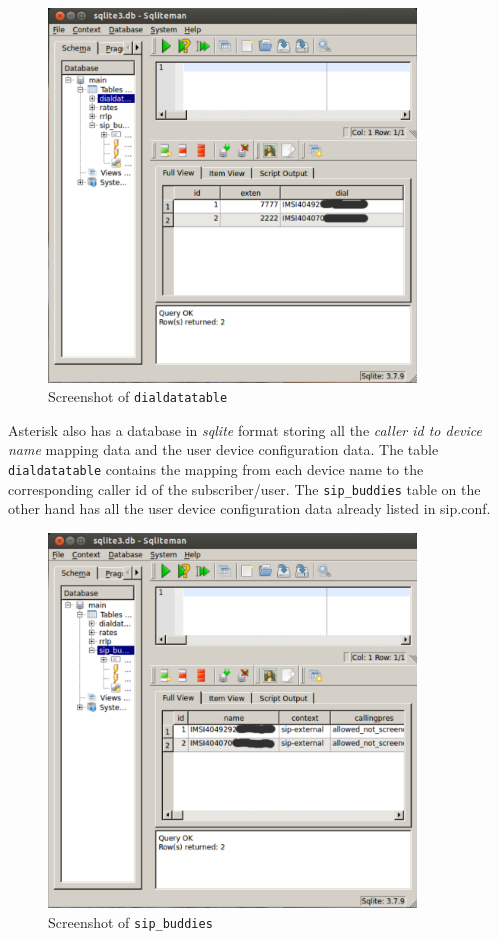 \begin{figure}
  \centering
    \includegraphics[width=0.87\textwidth]{../images/dialdata}
  \caption[Screenshot - dialdatatable]{Screenshot of \texttt{dialdatatable}}
  \label{dialdata}
\end{figure}

Asterisk also has a database in \textsl{sqlite} format storing all the 
\emph{caller id to device name} mapping data and the user device configuration
data. The table \texttt{dialdatatable} contains the mapping from each device
name to the corresponding caller id of the subscriber/user. The
\texttt{sip\_buddies} table on the other hand has all the user device 
configuration data already listed in \textsf{sip.conf}.

\begin{figure}
  \centering
    \includegraphics[width=0.87\textwidth]{../images/sipbuddies}
  \caption[Screenshot - sip\_buddies]{Screenshot of \texttt{sip\_buddies}}
  \label{sipbuddies}
\end{figure}


